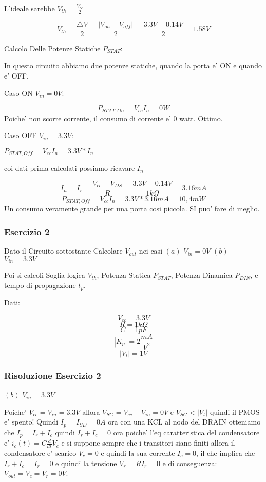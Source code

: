 \documentclass[\main/main.tex]{subfiles}
\begin{document}
L'ideale sarebbe $V_{th} = \frac{V_{cc}}{2}$

\[V_{th} = \frac{\bigtriangleup V}{2} = \frac{\left | V_{on} - V_{off} \right |}{2} = \frac{3.3V - 0.14V}{2} = 1.58V\]

Calcolo Delle Potenze Statiche $P_{STAT}$:

In questo circuito abbiamo due potenze statiche, quando la porta e' ON e quando e' OFF.

Caso ON $V_{in} = 0V$:

\[P_{STAT,On} = V_{cc} I_{n} = 0W\]
Poiche' non scorre corrente, il consumo di corrente e' 0 watt. Ottimo.


Caso OFF $V_{in} = 3.3V$:

$P_{STAT,Off} = V_{cc} I_{n} = 3.3V * I_{n}$

coi dati prima calcolati possiamo ricavare $I_{n}$

\[I_{n} = I_{r} = \frac{V_{cc} - V_{DS}}{R} = \frac{3.3V - 0.14V}{1k\Omega} = 3.16mA\]
\[P_{STAT,Off} = V_{cc} I_{n} = 3.3V * 3.16mA = 10,4mW\]
Un consumo veramente grande per una porta cosi piccola. SI puo' fare di meglio.

\clearpage
\subsubsection{Esercizio 2}
Dato il Circuito sottostante Calcolare $V_{out}$ nei casi 
$(a)$ $V_{in} = 0V$
$(b)$ $V_{in} = 3.3V$

Poi si calcoli Soglia logica $V_{th}$, Potenza Statica $P_{STAT}$, Potenza Dinamica $P_{DIN}$, e tempo di propagazione $t_p$.



Dati:

\[V_{cc} = 3.3V\]
\[R = 1k\Omega\]
\[C = 1pF\]
\[|K_p| = 2 \frac{mA}{V^2}\]
\[|V_t| = 1V\]
\subsubsection{Risoluzione Esercizio 2}
$(b)$ $V_{in} = 3.3V$

Poiche' $V_{cc} = V_{in} = 3.3V$ allora $V_{SG} = V_{cc} - V_{in} = 0V$ e 
$V_{SG} < |V_t|$ quindi il PMOS e' spento! Quindi $I_p = I_{SD} = 0A$ ora con una KCL al nodo del DRAIN otteniamo che $I_p = I_r + I_c$ quindi $I_r + I_c = 0$ ora poiche' l'eq caratteristica del condensatore e' $i_c(t) = C \frac{d}{dt}V_c$ e si suppone sempre che i transitori siano finiti allora il condensatore e' scarico $V_c = 0$ e quindi la sua corrente $I_c = 0$, il che implica che $I_r + I_c = I_r = 0$ e quindi la tensione $V_r = R I_r = 0$ e di conseguenza: $V_{out} = V_c = V_r = 0V$.
\end{document}
